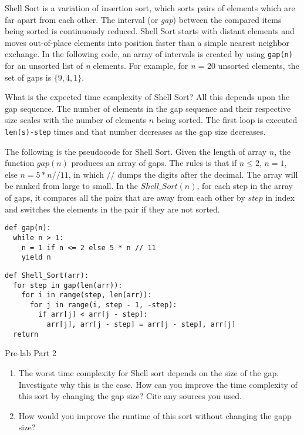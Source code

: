 \documentclass[11pt]{article}
\begin{document}
Shell Sort is a variation of insertion sort, which sorts pairs of elements which
are far apart from each other. The interval (or \textit{gap}) between the
compared items being sorted is continuously reduced. Shell Sort starts with
distant elements and moves out-of-place elements into position faster than a
simple nearest neighbor exchange. In the following code, an array of intervals
is created  by using \texttt{gap(n)} for an unsorted list of \textit{n}
elements. For example, for \textit{n} = 20 unsorted elements, the set of gaps is
$\{9, 4, 1\}$.

What is the expected time complexity of Shell Sort? All this depends upon the
gap sequence. The number of elements in the gap sequence and their respective
size scales with the number of elements $n$ being sorted. The first loop is
executed \texttt{len(s)-step} times and that number decreases as the gap size
decreases.

The following is the pseudocode for Shell Sort. Given the length of array $n$,
the function $gap(n)$ produces an array of gaps. The rules is that if $n \leq
2$, $n = 1$, else $n = 5*n//11$, in which $//$ dumps the digits after the
decimal. The array will be ranked from large to small. In the $Shell\_Sort(n)$,
for each step in the array of gaps, it compares all the pairs that are away from
each other by $step$ in index and switches the elements in the pair if they are
not sorted.

\begin{lstlisting}[title=gap (pseudocode)]
def gap(n):
  while n > 1:
    n = 1 if n <= 2 else 5 * n // 11
    yield n
\end{lstlisting}

\begin{lstlisting}[title=Shell Sort (pseudocode)]
def Shell_Sort(arr):
  for step in gap(len(arr)):
    for i in range(step, len(arr)):
      for j in range(i, step - 1, -step):
        if arr[j] < arr[j - step]:
          arr[j], arr[j - step] = arr[j - step], arr[j]
  return
\end{lstlisting}

\medskip
\begin{prelab}{Pre-lab Part 2}
    \begin{enumerate}
	\item The worst time complexity for Shell sort depends on the size
	      of the gap. Investigate why this is the case. How can you
	      improve the time complexity of this sort by changing the gap
	      size? Cite any sources you used.
	\item How would you improve the runtime of this sort without changing
	      the gapp size?
    \end{enumerate}
\end{prelab}
\end{document}
